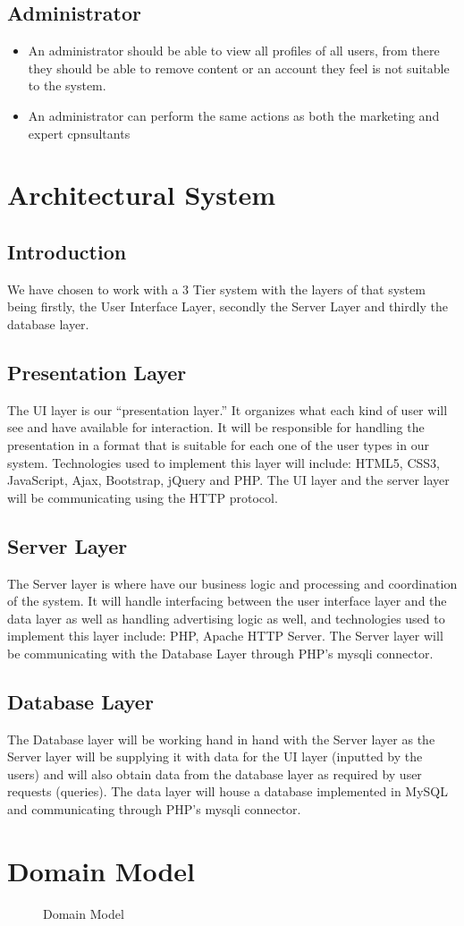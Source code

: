 \documentclass[10pt]{article}
\begin{document}
\subsection*{Administrator}
\begin{itemize}
\item An administrator should be able to view all profiles of all users, from there they should be able to remove content or an account they feel is not suitable to the system.
\item An administrator can perform the same actions as both the marketing and expert cpnsultants
\end{itemize}

\section*{Architectural System}
\subsection*{Introduction}
We have chosen to work with a 3 Tier system with the layers of that system being firstly, the User Interface Layer, secondly the Server Layer and thirdly the database layer.

\subsection*{Presentation Layer}
The UI layer is our “presentation layer.” It organizes what each kind of user will see and have available for interaction. It will be responsible for handling the presentation in a format that is suitable for each one of the user types in our system. Technologies used to implement this layer will include: HTML5, CSS3, JavaScript, Ajax, Bootstrap, jQuery and PHP. The UI layer and the server layer will be communicating using the HTTP protocol.
\subsection*{Server Layer}
The Server layer is where have our business logic and processing and coordination of the system. It will handle interfacing between the user interface layer and the data layer as well as handling advertising logic as well, and technologies used to implement this layer include: PHP, Apache HTTP Server. The Server layer will be communicating with the Database Layer through PHP's mysqli connector. 
\subsection*{Database Layer}
The Database layer will be working hand in hand with the Server layer as the Server layer will be supplying it with data for the UI layer (inputted by the users) and will also obtain data from the database layer as required by user requests (queries). The data layer will house a database implemented in MySQL and communicating through PHP's mysqli connector. 

\section {Domain Model}
\begin {figure}
\caption{Domain Model}
\label{Domain Model}
\end{figure}
\end{document}
